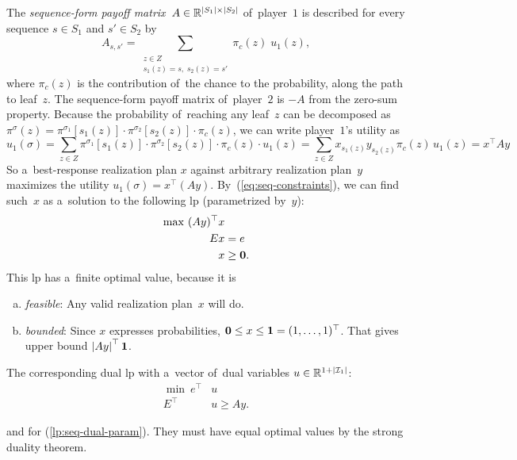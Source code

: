 The \emph{sequence-form payoff matrix}~$A \in \mathbb{R} ^{\left\vert S_1 \right\vert \times \left\vert S_2 \right\vert}$ of~player~$1$ is described for every sequence $s \in S_1$ and $s' \in S_2$ by
\[
  A _{s,s'} = \sum _{\substack{z \in Z\\ s_1(z) = s,\; s_2(z) = s'}} \pi_c (z) \; u_1(z),
\]
where $\pi_c (z)$ is the contribution of~the chance to the probability, along the path to leaf~$z$.
The sequence-form payoff matrix of~player~$2$ is $-A$ from the zero-sum property.
Because the probability of~reaching any leaf~$z$ can be decomposed as
$
\pi^\sigma(z) =
\pi^{\sigma_1}[s_1(z)] \cdot
\pi^{\sigma_2}[s_2(z)] \cdot
\pi_c(z)
$,
we can write player~$1$'s utility as
\[
  u_1(\sigma)
  = \sum _{z \in Z}
  \pi^{\sigma_1}[s_1(z)] \cdot
  \pi^{\sigma_2}[s_2(z)] \cdot
  \pi_c(z) \cdot
  u_1(z)
  = \sum _{z \in Z}
  x_{s_1(z)}
  y_{s_2(z)}
  \pi_c(z) \,
  u_1(z)
  = x ^\top A y
\]
So a~best-response realization plan $x$ against arbitrary realization plan~$y$ maximizes the utility $u_1(\sigma) = x ^\top (Ay)$.
By~(\ref{eq:seq-constraints}), we can find such~$x$ as a~solution to the following \acrshort{lp} (parametrized by~$y$):
\begin{equation}
  \label{lp:seq-primal-param}
  \begin{split}
    \max\ (Ay)^\top &x \\
    E&x = e \\
    &x \ge \boldsymbol{0}.
  \end{split}
\end{equation}
This \acrshort{lp} has a~finite optimal value, because it is
\begin{enumerate}[(a)]
  \item \emph{feasible}: Any valid realization plan~$x$ will do.
  \item \emph{bounded}: Since $x$ expresses probabilities, $\boldsymbol{0} \le x \le \boldsymbol{1} = (1, \dots, 1)^\top$.
    That gives upper bound $\left\vert Ay \right\vert ^\top \boldsymbol{1}$.
\end{enumerate}
The corresponding dual \acrshort{lp} with a~vector of~dual variables $u \in \mathbb{R}^{1 + \left\vert \mathcal{I}_1 \right\vert}$:
\begin{equation}
  \label{lp:seq-dual-param}
  \begin{split}
    \min\  e^\top &u \\
    E^\top &u \ge Ay.
  \end{split}
\end{equation}

and for (\ref{lp:seq-dual-param}).
They must have equal optimal values by the strong duality theorem.

